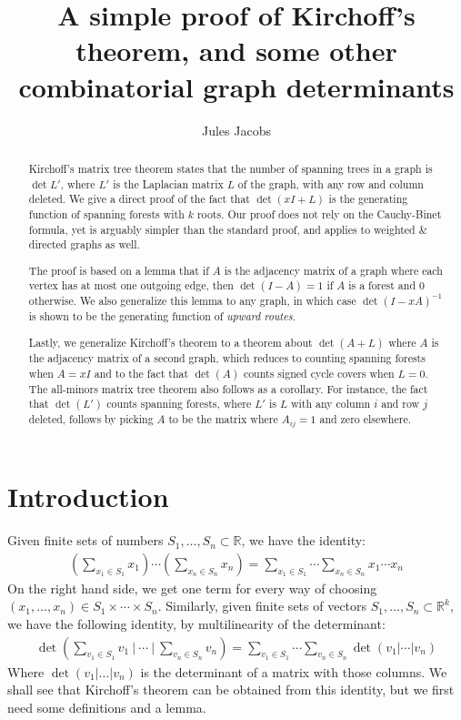 \documentclass[a4paper, 11pt]{article}
\title{A simple proof of Kirchoff's theorem, and some other combinatorial graph determinants}
\author{Jules Jacobs}
\newcommand{\R}{\mathbb{R}}
\theoremstyle{definition}
\begin{document}
\maketitle

\begin{abstract}
  Kirchoff's matrix tree theorem states that the number of spanning trees in a graph is $\det L'$, where $L'$ is the Laplacian matrix $L$ of the graph, with any row and column deleted. We give a direct proof of the fact that $\det(xI + L)$ is the generating function of spanning forests with $k$ roots. Our proof does not rely on the Cauchy-Binet formula, yet is arguably simpler than the standard proof, and applies to weighted \& directed graphs as well.

  The proof is based on a lemma that if $A$ is the adjacency matrix of a graph where each vertex has at most one outgoing edge, then $\det(I - A) = 1$ if $A$ is a forest and $0$ otherwise. We also generalize this lemma to any graph, in which case $\det(I-xA)^{-1}$ is shown to be the generating function of \emph{upward routes}.

  Lastly, we generalize Kirchoff's theorem to a theorem about $\det(A + L)$ where $A$ is the adjacency matrix of a second graph, which reduces to counting spanning forests when $A = xI$ and to the fact that $\det(A)$ counts signed cycle covers when $L = 0$. The all-minors matrix tree theorem also follows as a corollary. For instance, the fact that $\det(L')$ counts spanning forests, where $L'$ is $L$ with any column $i$ and row $j$ deleted, follows by picking $A$ to be the matrix where $A_{ij} = 1$ and zero elsewhere.
\end{abstract}

\section{Introduction}

Given finite sets of numbers $S_1, \dots, S_n \subset \R$, we have the identity:
\begin{align*}
  \left( \sum_{x_1 \in S_1} x_1 \right) \cdots \left( \sum_{x_n \in S_n} x_n \right) =
  \sum_{x_1 \in S_1} \cdots \sum_{x_n \in S_n} x_1 \cdots x_n
\end{align*}
On the right hand side, we get one term for every way of choosing $(x_1,\dots,x_n)\in S_1 \times \cdots \times S_n$. Similarly, given finite sets of vectors $S_1, \dots, S_n \subset \R^k$, we have the following identity, by multilinearity of the determinant:
\begin{align*}
  \det\left(\sum_{v_1 \in S_1} v_1\ \bigg\rvert\ \cdots\ \bigg\rvert\ \sum_{v_n \in S_n} v_n\right) =
  \sum_{v_1 \in S_1} \cdots \sum_{v_n \in S_n} \det \left(v_1 | \cdots | v_n\right)
\end{align*}
Where $\det(v_1 | \dots | v_n)$ is the determinant of a matrix with those columns. We shall see that Kirchoff's theorem can be obtained from this identity, but we first need some definitions and a lemma.
\end{document}
